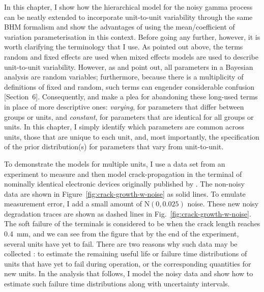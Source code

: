 In this chapter, I show how the hierarchical model for the noisy gamma process can be neatly extended to incorporate unit-to-unit variability through the same BHM formalism and show the advantages of using the mean/coefficient of variation parameterisation in this context. Before going any further, however, it is worth clarifying the terminology that I use. As pointed out above, the terms random and fixed effects are used when mixed effects models are used to describe unit-to-unit variability. However, as \citet{Gelman2005} and \citet{gelman2006} point out, all parameters in a Bayesian analysis are random variables; furthermore, because there is a multiplicity of definitions of fixed and random, such terms can engender considerable confusion [Section~6]\citep{Gelman2005}. Consequently, \citet{Gelman2005} and \citet{gelman2006} make a plea for abandoning these long-used terms in place of more descriptive ones: \emph{varying}, for parameters that differ between groups or units, and \emph{constant}, for parameters that are identical for all groups or units. In this chapter, I simply identify which parameters are common across units, those that are unique to each unit, and, most importantly, the specification of the prior distribution(s) for parameters that vary from unit-to-unit.

To demonstrate the models for multiple units, I use a data set from an experiment to measure and then model crack-propagation in the terminal of nominally identical electronic devices originally published by \citet{rodriguez-picon2018}. The non-noisy data are shown in Figure~\ref{fig:crack-growth-w-noise} as solid lines. To emulate measurement error, I add a small amount of $\mathrm{N}(0, 0.025)$ noise. These new noisy degradation traces are shown as dashed lines in Fig.~\ref{fig:crack-growth-w-noise}. The soft failure of the terminals is considered to be when the crack length reaches 0.4~mm, and we can see from the figure that by the end of the experiment, several units have yet to fail. There are two reasons why such data may be collected \citep{robinson2000}: to estimate the remaining useful life or failure time distributions of units that have yet to fail during operation, or the corresponding quantities for new units. In the analysis that follows, I model the noisy data and show how to estimate such failure time distributions along with uncertainty intervals.

